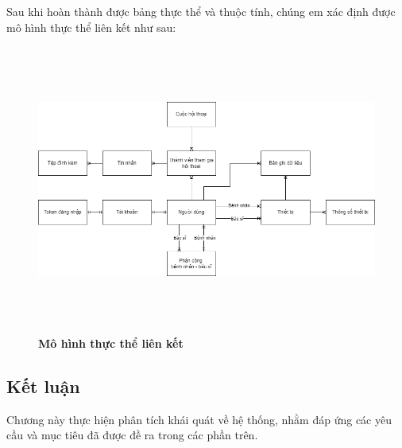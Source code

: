 Sau khi hoàn thành được bảng thực thể và thuộc tính, chúng em xác định được mô hình thực thể liên kết như sau:

\begin{figure}[H]
  \centering
  \includegraphics[width=15cm,height=9.5cm]{Images/system/fmECG_connection_entity.png}
  \caption[Mô hình thực thể liên kết]{\bfseries \fontsize{12pt}{0pt}
  \selectfont Mô hình thực thể liên kết}
  \label{ttlk} %
\end{figure}

\subsection{Kết luận}

Chương này thực hiện phân tích khái quát về
 hệ thống, nhằm đáp ứng các yêu cầu và mục tiêu đã được đề ra trong các phần trên.

\newpage
